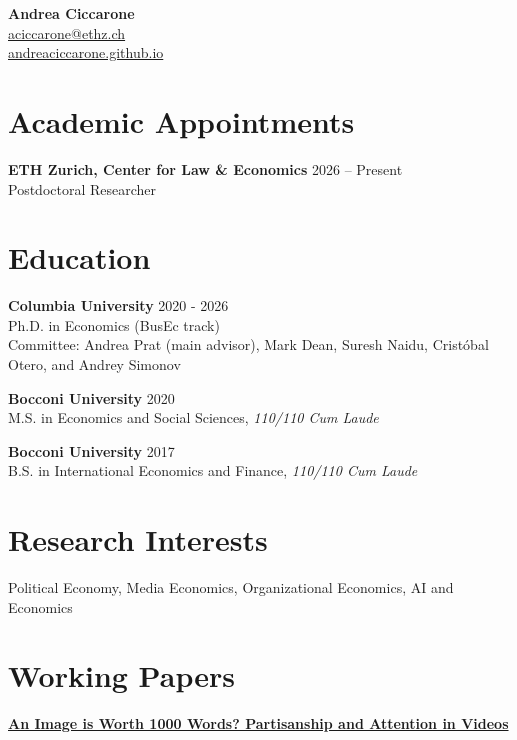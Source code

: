 \documentclass[10pt,letterpaper]{article}
\begin{document}
\begin{center}
{\Large \textbf{Andrea Ciccarone}}\\[3pt]
\href{mailto:aciccarone@ethz.ch}{aciccarone@ethz.ch}\\
\href{https://andreaciccarone.github.io}{andreaciccarone.github.io}
\end{center}

\section*{Academic Appointments}

\textbf{ETH Zurich, Center for Law \& Economics} \hfill 2026 -- Present\\
Postdoctoral Researcher

\section*{Education}

\textbf{Columbia University} \hfill 2020 - 2026\\
Ph.D. in Economics (BusEc track)\\
{\small Committee: Andrea Prat (main advisor), Mark Dean, Suresh Naidu, Crist\'obal Otero, and Andrey Simonov}

\medskip

\textbf{Bocconi University} \hfill 2020\\
M.S. in Economics and Social Sciences, \textit{110/110 Cum Laude}

\medskip

\textbf{Bocconi University} \hfill 2017\\
B.S. in International Economics and Finance, \textit{110/110 Cum Laude}

\section*{Research Interests}

Political Economy, Media Economics, Organizational Economics, AI and Economics

\section*{Working Papers}

\textbf{\href{https://andreaciccarone.github.io/Video_Partisanship_draft.pdf}{An Image is Worth 1000 Words? Partisanship and Attention in Videos}}
\end{document}
